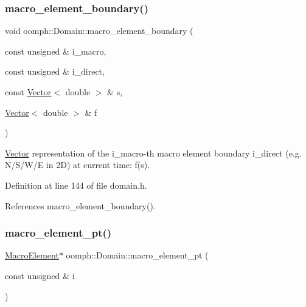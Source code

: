 \subsubsection{\texorpdfstring{macro\+\_\+element\+\_\+boundary()}{macro\_element\_boundary()}\hspace{0.1cm}{\footnotesize\ttfamily [2/2]}}
{\footnotesize\ttfamily void oomph\+::\+Domain\+::macro\+\_\+element\+\_\+boundary (\begin{DoxyParamCaption}\item[{const unsigned \&}]{i\+\_\+macro,  }\item[{const unsigned \&}]{i\+\_\+direct,  }\item[{const \hyperlink{classoomph_1_1Vector}{Vector}$<$ double $>$ \&}]{s,  }\item[{\hyperlink{classoomph_1_1Vector}{Vector}$<$ double $>$ \&}]{f }\end{DoxyParamCaption})\hspace{0.3cm}{\ttfamily [inline]}}



\hyperlink{classoomph_1_1Vector}{Vector} representation of the i\+\_\+macro-\/th macro element boundary i\+\_\+direct (e.\+g. N/\+S/\+W/E in 2D) at current time\+: f(s). 



Definition at line 144 of file domain.\+h.



References macro\+\_\+element\+\_\+boundary().

\mbox{\label{classoomph_1_1Domain_a9d8ca47c89812a0d6dda0b9142441efc}} 
\subsubsection{\texorpdfstring{macro\+\_\+element\+\_\+pt()}{macro\_element\_pt()}}
{\footnotesize\ttfamily \hyperlink{classoomph_1_1MacroElement}{Macro\+Element}$\ast$ oomph\+::\+Domain\+::macro\+\_\+element\+\_\+pt (\begin{DoxyParamCaption}\item[{const unsigned \&}]{i }\end{DoxyParamCaption})\hspace{0.3cm}{\ttfamily [inline]}}



